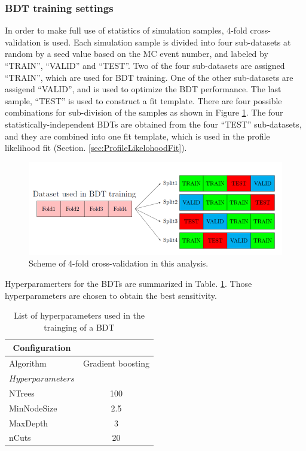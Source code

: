 \subsubsection{BDT training settings}
\label{subsubsec:BDTTrainingSettings}
In order to make full use of statistics of simulation samples, 4-fold cross-validation is used. Each simulation sample is divided into four sub-datasets at random by a seed value based on the MC event number, and labeled by ``TRAIN'', ``VALID'' and ``TEST''. Two of the four sub-datasets are assigned ``TRAIN'', which are used for BDT training. One of the other sub-datasets are assigend ``VALID'', and is used to optimize the BDT performance. The last sample, ``TEST'' is used to construct a fit template. There are four possible combinations for sub-division of the samples as shown in Figure \ref{fig:CrossValidationScheme}. The four statistically-independent BDTs are obtained from the four ``TEST'' sub-datasets, and they are combined into one fit template, which is used in the profile likelihood fit (Section. \ref{sec:ProfileLikelohoodFit}).

\begin{figure}[H]
  \centering
  \includegraphics[keepaspectratio,scale=0.50]{images/AnalysisStrategy/CrossValidationScheme.png}
  \caption{Scheme of 4-fold cross-validation in this analysis.}
  \label{fig:CrossValidationScheme}
\end{figure}

Hyperparamerters for the BDTs are summarized in Table. \ref{tab:Hyperparameters}. Those hyperparameters are chosen to obtain the best sensitivity.
    
\begin{table}[H]
  \centering
  \begin{tabular*}{75mm}{@{\extracolsep{\fill}}ll}
    \hline
    \multicolumn{1}{c}{Configuration} & \multicolumn{1}{c}{}\\
    \hline\hline
    \multicolumn{1}{l}{Algorithm}     & \multicolumn{1}{c}{Gradient boosting}\\
    \hline
    $Hyperparameters$ & \\
    \multicolumn{1}{l}{NTrees}       & \multicolumn{1}{c}{100}\\
    \multicolumn{1}{l}{MinNodeSize}  & \multicolumn{1}{c}{2.5}\\
    \multicolumn{1}{l}{MaxDepth}     & \multicolumn{1}{c}{3}\\
    \multicolumn{1}{l}{nCuts}        & \multicolumn{1}{c}{20}\\
    \hline
  \end{tabular*}
  \caption{List of hyperparameters used in the trainging of a BDT}
  \label{tab:Hyperparameters}
\end{table}
    
